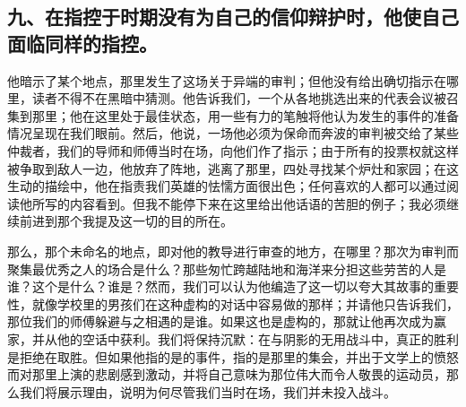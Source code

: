 \subsection{九、在指控于时期没有为自己的信仰辩护时，他使自己面临同样的指控。}

他暗示了某个地点，那里发生了这场关于异端的审判；但他没有给出确切指示在哪里，读者不得不在黑暗中猜测。他告诉我们，一个从各地挑选出来的代表会议被召集到那里；他在这里处于最佳状态，用一些有力的笔触将他认为发生的事件的准备情况呈现在我们眼前。然后，他说，一场他必须为保命而奔波的审判被交给了某些仲裁者，我们的导师和师傅当时在场，向他们作了指示；由于所有的投票权就这样被争取到敌人一边，他放弃了阵地，逃离了那里，四处寻找某个炉灶和家园；在这生动的描绘中，他在指责我们英雄的怯懦方面很出色；任何喜欢的人都可以通过阅读他所写的内容看到。但我不能停下来在这里给出他话语的苦胆的例子；我必须继续前进到那个我提及这一切的目的所在。\par

那么，那个未命名的地点，即对他的教导进行审查的地方，在哪里？那次为审判而聚集最优秀之人的场合是什么？那些匆忙跨越陆地和海洋来分担这些劳苦的人是谁？这个是什么？谁是？然而，我们可以认为他编造了这一切以夸大其故事的重要性，就像学校里的男孩们在这种虚构的对话中容易做的那样；并请他只告诉我们，那位我们的师傅躲避与之相遇的是谁。如果这也是虚构的，那就让他再次成为赢家，并从他的空话中获利。我们将保持沉默：在与阴影的无用战斗中，真正的胜利是拒绝在取胜。但如果他指的是的事件，指的是那里的集会，并出于文学上的愤怒而对那里上演的悲剧感到激动，并将自己意味为那位伟大而令人敬畏的运动员，那么我们将展示理由，说明为何尽管我们当时在场，我们并未投入战斗。\par

